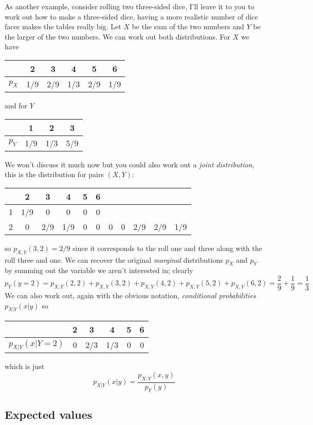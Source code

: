 \documentclass[11pt,a4paper]{scrartcl}
\begin{document}
As another example, consider rolling two three-sided dice, I'll leave it to you to work
out how to make a three-sided dice, having a more realistic number of
dice faces makes the tables really big. Let $X$ be the sum of the two
numbers and $Y$ be the larger of the two numbers. We can work out both
distributions. For $X$ we have
\begin{center}
\begin{tabular}{c|ccccc}
&2&3&4&5&6\\
\hline
$p_X$&1/9&2/9&1/3&2/9&1/9
\end{tabular}
\end{center}
and for $Y$
\begin{center}
\begin{tabular}{c|ccc}
&1&2&3\\
\hline
$p_Y$&1/9&1/3&5/9
\end{tabular}
\end{center}
We won't discuss it much now but you could also work out a \textsl{joint distribution}, this is the
distribution for pairs $(X,Y)$:
\begin{center}
\begin{tabular}{c|ccccc}
&2&3&4&5&6\\
&  1/9&0&0&0&0\\
2&  0&2/9&1/9&0&0&  0&0&2/9&2/9&1/9
\end{tabular}
\end{center}
so $p_{X,Y}(3,2)=2/9$ since it corresponds to the roll one and three
along with the roll three and one. We can recover the original
\textsl{marginal} distributions $p_X$ and $p_Y$ by summing out the
variable we aren't interested in; clearly
\begin{equation}
p_Y(y=2)=p_{X,Y}(2,2)+p_{X,Y}(3,2)+p_{X,Y}(4,2)+p_{X,Y}(5,2)+p_{X,Y}(6,2)=\frac{2}{9}+\frac{1}{9}=\frac{1}{3}
\end{equation}
We can also work out, again with the obvious notation, \textsl{conditional probabilities} $p_{X|Y}(x|y)$ so
\begin{center}
\begin{tabular}{c|ccccc}
&2&3&4&5&6\\
\hline
$p_{X|Y}(x|Y=2)$&0&2/3&1/3&0&0
\end{tabular}
\end{center}
which is just
\begin{equation}
p_{X|Y}(x|y)=\frac{p_{X,Y}(x,y)}{p_Y(y)}
\end{equation}

\subsection*{Expected values}
\end{document}
